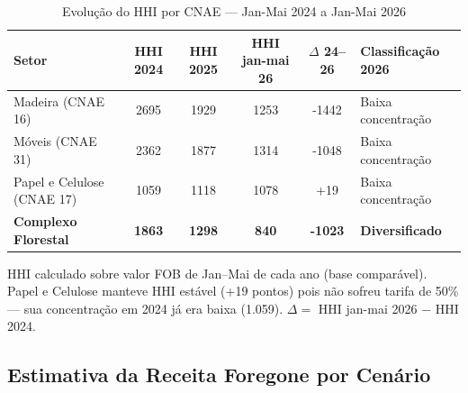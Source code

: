 \documentclass[12pt, a4paper]{article}
\begin{document}
\begin{table}[H]
  \centering
  \caption{Evolução do HHI por CNAE --- Jan-Mai 2024 a Jan-Mai 2026}
  \label{tab:hhi}
  \renewcommand{\arraystretch}{1.4}
  \small
  \begin{tabular}{l
      S[table-format=4.0]
      S[table-format=4.0]
      S[table-format=4.0]
      S[table-format=-4.0]
      l}
    \toprule
    \textbf{Setor}
      & \textbf{HHI 2024}
      & \textbf{HHI 2025}
      & \textbf{HHI jan-mai 26}
      & \textbf{$\Delta$ 24--26}
      & \textbf{Classificação 2026} \\
    \midrule
    Madeira (CNAE 16)          & 2695 & 1929 & 1253 & -1442 & Baixa concentração \\
    Móveis (CNAE 31)           & 2362 & 1877 & 1314 & -1048 & Baixa concentração \\
    Papel e Celulose (CNAE 17) & 1059 & 1118 & 1078 &   +19 & Baixa concentração \\
    \midrule
    \textbf{Complexo Florestal}
      & \textbf{1863} & \textbf{1298} & \textbf{840}
      & \textbf{-1023} & \textbf{Diversificado} \\
    \bottomrule
  \end{tabular}
  \begin{minipage}{\textwidth}
    \vspace{4pt}\footnotesize
    HHI calculado sobre valor FOB de Jan--Mai de cada ano (base comparável).
    Papel e Celulose manteve HHI estável (+19 pontos) pois não sofreu
    tarifa de 50\% --- sua concentração em 2024 já era baixa (1.059).
    $\Delta = $ HHI jan-mai 2026 $-$ HHI 2024.
  \end{minipage}
\end{table}

\subsection{Estimativa da Receita Foregone por Cenário}
\end{document}
